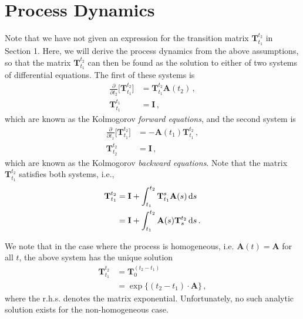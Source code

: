 \documentclass[10pt]{article}
\newcommand{\dx}[1][x]{\text{\,d}#1}
\begin{document}
\section{Process Dynamics}

Note that we have not given an expression for the transition matrix $\mathbf{T}_{t_1}^{t_2}$ in Section 1. Here, we will derive the process dynamics from the above assumptions, so that the matrix $\mathbf{T}_{t_1}^{t_2}$ can then be found as the solution to either of two systems of differential equations. The first of these systems is
\begin{align*}
\frac{\partial}{\partial t_2}\bigl[\mathbf{T}_{t_1}^{t_2}\bigr] &= \mathbf{T}_{t_1}^{t_2}\mathbf{A}(t_2)\,, \\
 \mathbf{T}_{t_1}^{t_1} &= \mathbf{I}\,,
\end{align*}
which are known as the Kolmogorov \emph{forward equations}, and the second system is
\begin{align*}
\frac{\partial}{\partial t_1}\bigl[\mathbf{T}_{t_1}^{t_2}\bigr] &= -\mathbf{A}(t_1)\mathbf{T}_{t_1}^{t_2}\,, \\
\mathbf{T}_{t_2}^{t_2} &= \mathbf{I}\,,
\end{align*}
which are known as the Kolmogorov \emph{backward equations}. Note that the matrix $\mathbf{T}_{t_1}^{t_2}$ satisfies both systems, i.e.,
\begin{align*}
\mathbf{T}_{t_1}^{t_2} &= \mathbf{I} + \int_{t_1}^{t_2} \mathbf{T}_{t_1}^s\mathbf{A}(s)\dx[s] \\
 &= \mathbf{I} + \int_{t_1}^{t_2} \mathbf{A}(s)\mathbf{T}_{s}^{t_2}\dx[s]\,.
\end{align*}

We note that in the case where the process is homogeneous, i.e. $\mathbf{A}(t)=\mathbf{A}$ for all $t$, the above system has the unique solution
\begin{align*}
\mathbf{T}_{t_1}^{t_2} &= \mathbf{T}_{0}^{(t_2-t_1)} \\
 &= \exp\{(t_2-t_1)\cdot\mathbf{A}\}\,,
\end{align*}
where the r.h.s. denotes the matrix exponential. Unfortunately, no such analytic solution exists for the non-homogeneous case.
\end{document}
